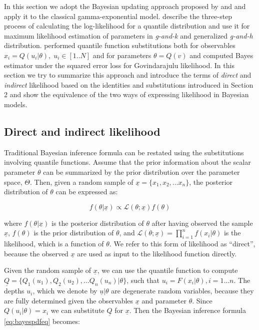 \documentclass[
  12pt,
]{article}
\begin{document}
In this section we adopt the Bayesian updating approach proposed by \citet{rayner2002NumericalMaximumLikelihood} and \citet{nair2020BayesianInferenceQuantile} and apply it to the classical gamma-exponential model. \citet{rayner2002NumericalMaximumLikelihood} describe the three-step process of calculating the log-likelihood for a quantile distribution and use it for maximum likelihood estimation of parameters in \emph{g-and-k} and generalized \emph{g-and-h} distribution. \citet{nair2020BayesianInferenceQuantile} performed quantile function substitutions both for observables \(x_i=Q(u_i|\theta), \; u_i \in [1..N]\) and for parameters \(\theta=Q(v)\) and computed Bayes estimator under the squared error loss for Govindarajulu likelihood. In this section we try to summarize this approach and introduce the terms of \emph{direct} and \emph{indirect} likelihood based on the identities and substitutions introduced in Section 2 and show the equivalence of the two ways of expressing likelihood in Bayesian models.

\hypertarget{direct-and-indirect-likelihood}{%
\subsection{Direct and indirect likelihood}\label{direct-and-indirect-likelihood}}

Traditional Bayesian inference formula can be restated using the substitutions involving quantile functions. Assume that the prior information about the scalar parameter \(\theta\) can be summarized by the prior distribution over the parameter space, \(\Theta\). Then, given a random sample of \(\underline x=\{x_1, x_2, \dots x_n\}\), the posterior distribution of \(\theta\) can be expressed as:

\[
f(\theta|\underline{x}) \propto \mathcal{L}(\theta;\underline{x})f(\theta)
\label{eq:bayespdfeq}
\]

where \(f(\theta|\underline{x})\) is the posterior distribution of \(\theta\) after having observed the sample \(\underline{x}\), \(f(\theta)\) is the prior distribution of \(\theta\), and \(\mathcal{L}(\theta;\underline x)=\prod_{i=1}^{n}f(x_i|\theta)\) is the likelihood, which is a function of \(\theta\). We refer to this form of likelihood as ``direct'', because the observed \(\underline x\) are used as input to the likelihood function directly.

Given the random sample of \(\underline x\), we can use the quantile function to compute \(\underline{Q}=\{Q_1(u_1), Q_2(u_2), \dots Q_n(u_n)|\theta\}\), such that \(u_i=F(x_i|\theta), i=1\dots n\). The depths \(u_i\), which we denote by \(\underline u|\theta\) are degenerate random variables, because they are fully determined given the observables \(\underline{x}\) and parameter \(\theta\). Since \(Q(u_i|\theta)=x_i\) we can substitute \(\underline Q\) for \(\underline x\). Then the Bayesian inference formula \eqref{eq:bayespdfeq} becomes:
\end{document}
